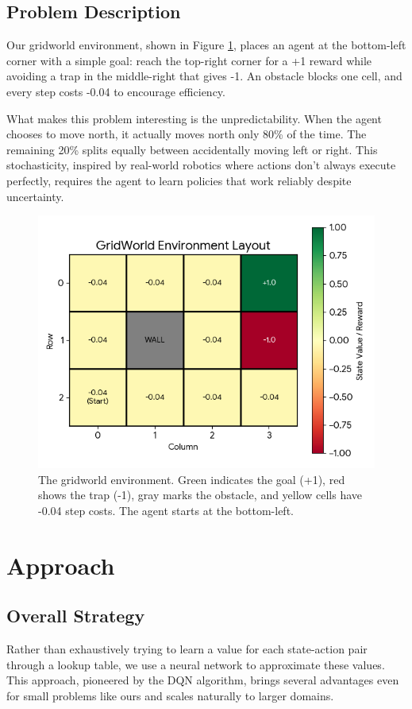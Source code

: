 \documentclass[conference]{IEEEtran}
\begin{document}
\subsection{Problem Description}

Our gridworld environment, shown in Figure \ref{fig:gridworld}, places an agent at the bottom-left corner with a simple goal: reach the top-right corner for a +1 reward while avoiding a trap in the middle-right that gives -1. An obstacle blocks one cell, and every step costs -0.04 to encourage efficiency.

What makes this problem interesting is the unpredictability. When the agent chooses to move north, it actually moves north only 80\% of the time. The remaining 20\% splits equally between accidentally moving left or right. This stochasticity, inspired by real-world robotics where actions don't always execute perfectly, requires the agent to learn policies that work reliably despite uncertainty.

\begin{figure}[htbp]
\centerline{\includegraphics[width=0.6\columnwidth]{images/GridWorld.png}}
\caption{The gridworld environment. Green indicates the goal (+1), red shows the trap (-1), gray marks the obstacle, and yellow cells have -0.04 step costs. The agent starts at the bottom-left.}
\label{fig:gridworld}
\end{figure}

\section{Approach}

\subsection{Overall Strategy}

Rather than exhaustively trying to learn a value for each state-action pair through a lookup table, we use a neural network to approximate these values. This approach, pioneered by the DQN algorithm, brings several advantages even for small problems like ours and scales naturally to larger domains.
\end{document}
